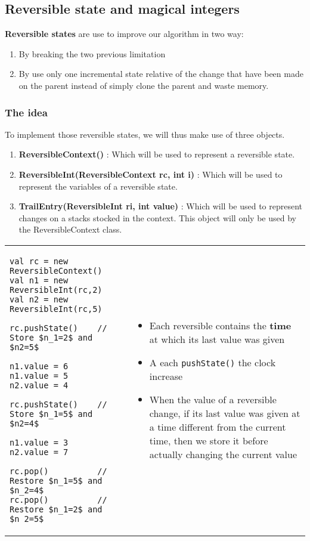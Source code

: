 \subsection{Reversible state and magical integers}

\textbf{Reversible states} are use to improve our algorithm in two way:
\begin{enumerate}
    \item By breaking the two previous limitation
    \item By use only one incremental state relative of the change
        that have been made on the parent instead of
            simply clone the parent and waste memory.
\end{enumerate}
        
\subsubsection{The idea}

To implement those reversible states, we will thus make use of three objects.

\begin{enumerate}
	\item \textbf{ReversibleContext()} : Which will be used to represent a 
	reversible state.
	\item \textbf{ReversibleInt(ReversibleContext rc, int i)} : Which will be used to 
	represent the variables of a reversible state.
	\item \textbf{TrailEntry(ReversibleInt ri, int value)} : Which will be used
	to represent changes on a stacks stocked in the context. This object will
	only be used by the ReversibleContext class.
\end{enumerate}

\begin{tabular}{m{8cm}m{7cm}}
\begin{lstlisting}[mathescape]
val rc = new ReversibleContext() 
val n1 = new ReversibleInt(rc,2)
val n2 = new ReversibleInt(rc,5) 

rc.pushState()    // Store $n_1=2$ and $n2=5$

n1.value = 6
n1.value = 5
n2.value = 4

rc.pushState()    // Store $n_1=5$ and $n2=4$

n1.value = 3
n2.value = 7

rc.pop()          // Restore $n_1=5$ and $n_2=4$
rc.pop()          // Restore $n_1=2$ and $n_2=5$
\end{lstlisting}
& 
\begin{itemize}
    \item Each reversible contains the \textbf{time} at which its last value was given
    \item A each \texttt{pushState()} the clock increase
    \item When the value of a reversible change, if its last value was given at a
        time different from the current time, then we store it before actually changing
        the current value
    \end{itemize}
\end{tabular}


